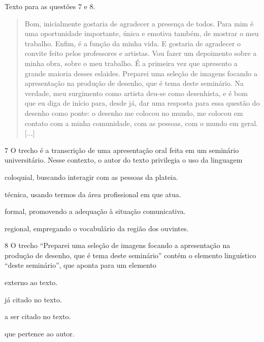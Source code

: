 Texto para as questões 7 e 8.

\begin{quote}
Bom, inicialmente gostaria de agradecer a presença de todos. Para mim é
uma oportunidade importante, única e emotiva também, de mostrar o meu
trabalho. Enfim, é a função da minha vida. E gostaria de agradecer o
convite feito pelos professores e artistas. Vou fazer um depoimento
sobre a minha obra, sobre o meu trabalho. É a primeira vez que apresento
a grande maioria desses eslaides. Preparei uma seleção de imagens
focando a apresentação na produção de desenho, que é tema deste
seminário. Na verdade, meu surgimento como artista deu-se como
desenhista, e é bom que eu diga de início para, desde já, dar uma
resposta para essa questão do desenho como ponte: o desenho me colocou
no mundo, me colocou em contato com a minha comunidade, com as pessoas,
com o mundo em geral. {[}...{]}

\end{quote}

\num{7} O trecho é a transcrição de uma apresentação oral feita em um seminário
universitário. Nesse contexto, o autor do texto privilegia o uso da linguagem

\begin{escolha}
\item
  coloquial, buscando interagir com as pessoas da plateia.
\item
  técnica, usando termos da área profissional em que atua.
\item
  formal, promovendo a adequação à situação comunicativa.
\item
  regional, empregando o vocabulário da região dos ouvintes.
\end{escolha}

\num{8} O trecho ``Preparei uma seleção de imagens focando a apresentação na
produção de desenho, que é tema deste seminário'' contém o elemento
linguístico ``deste seminário'', que aponta para um elemento

\begin{escolha}
\item externo ao texto.

\item já citado no texto.

\item a ser citado no texto.

\item que pertence ao autor.
\end{escolha}

